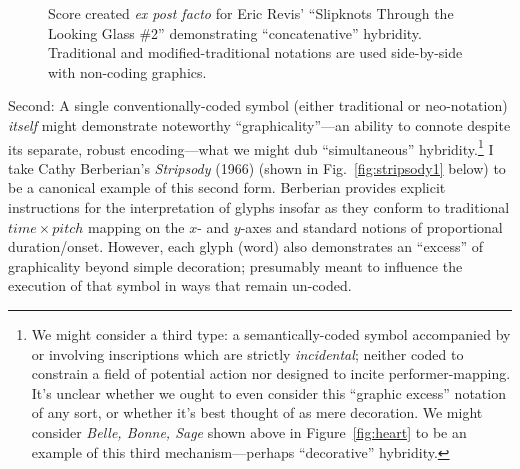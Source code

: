         \begin{figure} 
            \centering
            \captionsetup{width=.5\textwidth}
            \caption[Score created \textit{ex post facto} for Eric Revis' ``Slipknots Through the Looking Glass \#2'' demonstrating ``concatenative'' hybridity. Traditional and modified-traditional notations are used side-by-side with non-coding graphics.]{Score created \textit{ex post facto} for Eric Revis' ``Slipknots Through the Looking Glass \#2'' demonstrating ``concatenative'' hybridity. Traditional and modified-traditional notations are used side-by-side with non-coding graphics.\footnotemark}
            \label{fig:revis}
        \end{figure}

    Second: A single conventionally-coded symbol (either traditional or neo-notation) \textit{itself} might demonstrate noteworthy ``graphicality''---an ability to connote despite its separate, robust encoding---what we might dub ``simultaneous'' hybridity.\footnote{We might consider a third type: a semantically-coded symbol accompanied by or involving inscriptions which are strictly \textit{incidental}; neither coded to constrain a field of potential action nor designed to incite performer-mapping. It's unclear whether we ought to even consider this ``graphic excess'' notation of any sort, or whether it's best thought of as mere decoration. We might consider \textit{Belle, Bonne, Sage} shown above in Figure~\ref{fig:heart} to be an example of this third mechanism---perhaps ``decorative'' hybridity.} I take Cathy Berberian's \textit{Stripsody} (1966) (shown in Fig.~\ref{fig:stripsody1} below) to be a canonical example of this second form. Berberian provides explicit instructions for the interpretation of glyphs insofar as they conform to traditional ${time}\times{pitch}$ mapping on the $x$- and $y$-axes and standard notions of proportional duration/onset. However, each glyph (word) also demonstrates an ``excess'' of graphicality beyond simple decoration; presumably meant to influence the execution of that symbol in ways that remain un-coded. 


